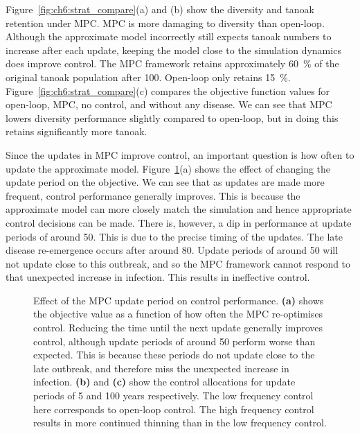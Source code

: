 Figure~\ref{fig:ch6:strat_compare}(a) and (b) show the diversity and tanoak retention under MPC\@. MPC is more damaging to diversity than open-loop. Although the approximate model incorrectly still expects tanoak numbers to increase after each update, keeping the model close to the simulation dynamics does improve control. The MPC framework retains approximately \SI{60}{\percent} of the original tanoak population after \SI{100}{\years}. Open-loop only retains \SI{15}{\percent}. Figure~\ref{fig:ch6:strat_compare}(c) compares the objective function values for open-loop, MPC, no control, and without any disease. We can see that MPC lowers diversity performance slightly compared to open-loop, but in doing this retains significantly more tanoak.

Since the updates in MPC improve control, an important question is how often to update the approximate model. Figure~\ref{fig:ch6:mpc_update}(a) shows the effect of changing the update period on the objective. We can see that as updates are made more frequent, control performance generally improves. This is because the approximate model can more closely match the simulation and hence appropriate control decisions can be made. There is, however, a dip in performance at update periods of around \SI{50}{\years}. This is due to the precise timing of the updates. The late disease re-emergence occurs after around \SI{80}{\years}. Update periods of around \SI{50}{\years} will not update close to this outbreak, and so the MPC framework cannot respond to that unexpected increase in infection. This results in ineffective control.

\begin{figure}
    \begin{center}
        \caption[Effect of MPC update period]{Effect of the MPC update period on control performance. \textbf{(a)} shows the objective value as a function of how often the MPC re-optimises control. Reducing the time until the next update generally improves control, although update periods of around \SI{50}{\years} perform worse than expected. This is because these periods do not update close to the late outbreak, and therefore miss the unexpected increase in infection. \textbf{(b)} and \textbf{(c)} show the control allocations for update periods of 5 and 100 years respectively. The low frequency control here corresponds to open-loop control. The high frequency control results in more continued thinning than in the low frequency control.\label{fig:ch6:mpc_update}}
    \end{center}
\end{figure}

